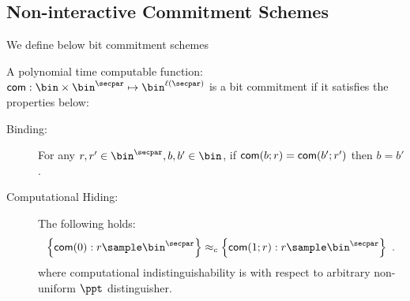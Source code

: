 
\subsection{Non-interactive Commitment Schemes}
	\label{sec:defn:commitment}
	
	We define below bit commitment schemes
	\begin{definition}
		A polynomial time computable function: $\com: \bin \times \bin^\secpar \mapsto \bin^{\ell(\secpar)}$ is a bit commitment if it satisfies the properties below:
		\begin{description}
			\item[Binding:] For any $r,r' \in \bin^\secpar, b,b' \in \bin$, if $\mathsf{com}(b;r)=\mathsf{com}(b';r')$ then $b=b'$.
			\item[Computational Hiding:] The following holds:
			\[
				\Big\lbrace \com(0):r \sample \bin^\secpar \Big\rbrace \approx_c \Big\lbrace \com(1;r):r \sample \bin^\secpar \Big\rbrace \enspace.
			\]			
			where computational indistinguishability is with respect to arbitrary non-uniform $\ppt$ distinguisher.
		\end{description}
		
	\end{definition}
